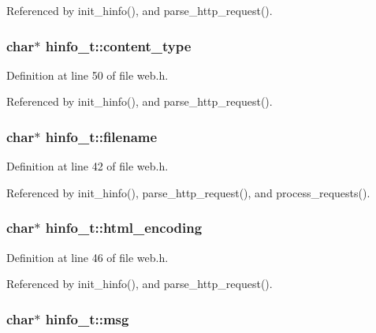 Referenced by init\-\_\-hinfo(), and parse\-\_\-http\-\_\-request().

\hypertarget{structhinfo__t_a87bad5ce6af7ed3613a61d01aef94d8d}{
\subsubsection[{content\-\_\-type}]{\setlength{\rightskip}{0pt plus 5cm}char$\ast$ hinfo\-\_\-t\-::content\-\_\-type}}\label{structhinfo__t_a87bad5ce6af7ed3613a61d01aef94d8d}


Definition at line 50 of file web.\-h.



Referenced by init\-\_\-hinfo(), and parse\-\_\-http\-\_\-request().

\hypertarget{structhinfo__t_a874ffdf5ade4e3844d7719444495e89c}{
\subsubsection[{filename}]{\setlength{\rightskip}{0pt plus 5cm}char$\ast$ hinfo\-\_\-t\-::filename}}\label{structhinfo__t_a874ffdf5ade4e3844d7719444495e89c}


Definition at line 42 of file web.\-h.



Referenced by init\-\_\-hinfo(), parse\-\_\-http\-\_\-request(), and process\-\_\-requests().

\hypertarget{structhinfo__t_ac03bcdde52e49a14bf9112f295f216b5}{
\subsubsection[{html\-\_\-encoding}]{\setlength{\rightskip}{0pt plus 5cm}char$\ast$ hinfo\-\_\-t\-::html\-\_\-encoding}}\label{structhinfo__t_ac03bcdde52e49a14bf9112f295f216b5}


Definition at line 46 of file web.\-h.



Referenced by init\-\_\-hinfo(), and parse\-\_\-http\-\_\-request().

\hypertarget{structhinfo__t_a06469570091ad74724457998e07d5b56}{
\subsubsection[{msg}]{\setlength{\rightskip}{0pt plus 5cm}char$\ast$ hinfo\-\_\-t\-::msg}}\label{structhinfo__t_a06469570091ad74724457998e07d5b56}


